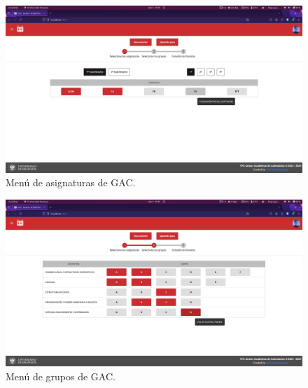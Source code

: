 \begin{figure}[H]
    \centering
    \includegraphics[width=1\textwidth]{imagenes/GAC_asignaturas.png}
    \caption{Menú de asignaturas de GAC.}
    \label{fig:GAC_asignaturas}
\end{figure}

\begin{figure}[H]
    \centering
    \includegraphics[width=1\textwidth]{imagenes/GAC_grupos.png}
    \caption{Menú de grupos de GAC.}
    \label{fig:GAC_grupos}
\end{figure}


